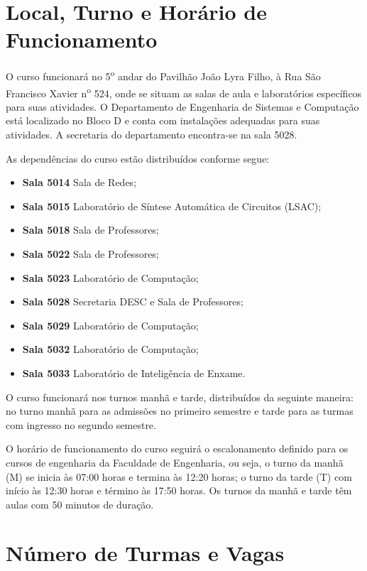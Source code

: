 \section{Local, Turno e Horário de Funcionamento}

O curso funcionará no 5\textsuperscript{o} andar do Pavilhão João Lyra Filho, à Rua São Francisco Xavier n\textsuperscript{o} 524, onde se situam as salas de aula e laboratórios específicos para suas atividades. O Departamento de Engenharia de Sistemas e Computação está localizado no Bloco D e conta com instalações adequadas para suas atividades. A secretaria do departamento encontra-se na sala 5028.

As dependências do curso estão distribuídos conforme segue:
\begin{itemize}
    \item \textbf{Sala 5014} Sala de Redes;
    \item \textbf{Sala 5015} Laboratório de Síntese Automática de Circuitos (LSAC);
    \item \textbf{Sala 5018} Sala de Professores;
    \item \textbf{Sala 5022} Sala de Professores;
    \item \textbf{Sala 5023} Laboratório de Computação;
    \item \textbf{Sala 5028} Secretaria DESC e Sala de Professores;
    \item \textbf{Sala 5029} Laboratório de Computação;
    \item \textbf{Sala 5032} Laboratório de Computação;
    \item \textbf{Sala 5033} Laboratório de Inteligência de Enxame.
\end{itemize}

O curso funcionará nos turnos manhã e tarde, distribuídos da seguinte maneira: no turno manhã para as admissões no primeiro semestre e tarde para as turmas com ingresso no segundo semestre.

O horário de funcionamento do curso seguirá o escalonamento definido para os cursos de engenharia da Faculdade de Engenharia, ou seja, o turno da manhã (M) se inicia às 07:00 horas e termina às 12:20 horas; o turno da tarde (T) com início às 12:30 horas e término às 17:50 horas. Os turnos da manhã e tarde têm aulas com 50 minutos de duração.

\section{Número de Turmas e Vagas}

